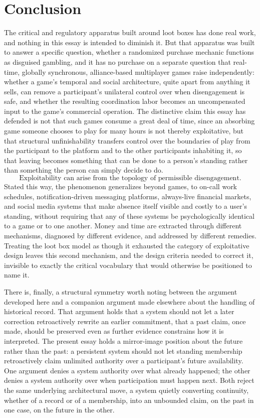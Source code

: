 \documentclass[11pt]{article}
\begin{document}
\section{Conclusion}

The critical and regulatory apparatus built around loot boxes has done real work, and nothing in this essay is intended to diminish it. But that apparatus was built to answer a specific question, whether a randomized purchase mechanic functions as disguised gambling, and it has no purchase on a separate question that real-time, globally synchronous, alliance-based multiplayer games raise independently: whether a game's temporal and social architecture, quite apart from anything it sells, can remove a participant's unilateral control over when disengagement is safe, and whether the resulting coordination labor becomes an uncompensated input to the game's commercial operation. The distinctive claim this essay has defended is not that such games consume a great deal of time, since an absorbing game someone chooses to play for many hours is not thereby exploitative, but that structural unfinishability transfers control over the boundaries of play from the participant to the platform and to the other participants inhabiting it, so that leaving becomes something that can be done to a person's standing rather than something the person can simply decide to do.
\[
\boxed{\text{Exploitability can arise from the topology of permissible disengagement.}}
\]
Stated this way, the phenomenon generalizes beyond games, to on-call work schedules, notification-driven messaging platforms, always-live financial markets, and social media systems that make absence itself visible and costly to a user's standing, without requiring that any of these systems be psychologically identical to a game or to one another. Money and time are extracted through different mechanisms, diagnosed by different evidence, and addressed by different remedies. Treating the loot box model as though it exhausted the category of exploitative design leaves this second mechanism, and the design criteria needed to correct it, invisible to exactly the critical vocabulary that would otherwise be positioned to name it.

There is, finally, a structural symmetry worth noting between the argument developed here and a companion argument made elsewhere about the handling of historical record. That argument holds that a system should not let a later correction retroactively rewrite an earlier commitment, that a past claim, once made, should be preserved even as further evidence constrains how it is interpreted. The present essay holds a mirror-image position about the future rather than the past: a persistent system should not let standing membership retroactively claim unlimited authority over a participant's future availability. One argument denies a system authority over what already happened; the other denies a system authority over when participation must happen next. Both reject the same underlying architectural move, a system quietly converting continuity, whether of a record or of a membership, into an unbounded claim, on the past in one case, on the future in the other.
\end{document}
